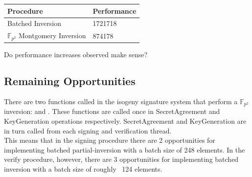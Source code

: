 \begin{center}
\begin{tabular}{@{}ll@{}}
	\toprule
	Procedure & Performance \\
	\midrule
	Batched Inversion & 1721718\\
	$\mathbb{F}_{p^{2}}$ Montgomery Inversion & 874178\\
	\bottomrule
\end{tabular}
\end{center}

Do performance increases observed make sense?\\

\subsection{Remaining Opportunities}
There are two functions called in the isogeny signature system that perform a $\mathbb{F}_{p^{2}}$ inversion:  and . These functions are called once in SecretAgreement and KeyGeneration operations respectively. SecretAgreement and KeyGeneration are in turn called from each signing and verification thread.\\

This means that in the signing procedure there are 2 opportunities for implementing batched partial-inversion with a batch size of 248 elements. In the verify procedure, however, there are 3 opportunities for implementing batched inversion with a batch size of roughly ~124 elements.\\

